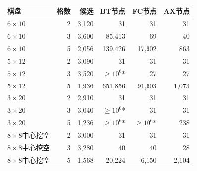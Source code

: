\begin{tabular}{lrrrrr}
\toprule
棋盘 & 格数 & 候选 & BT节点 & FC节点 & AX节点 \\
\midrule
$6\times10$ & 2 & 3,120 & 31 & 31 & 31 \\
$6\times10$ & 3 & 3,600 & 85,413 & 69 & 40 \\
$6\times10$ & 5 & 2,056 & 139,426 & 17,902 & 863 \\
$5\times12$ & 2 & 3,090 & 31 & 31 & 31 \\
$5\times12$ & 3 & 3,520 & $\geq 10^6$* & 27 & 27 \\
$5\times12$ & 5 & 1,936 & 651,856 & 91,603 & 1,073 \\
$3\times20$ & 2 & 2,910 & 31 & 31 & 31 \\
$3\times20$ & 3 & 3,040 & $\geq 10^6$* & 31 & 31 \\
$3\times20$ & 5 & 1,236 & $\geq 10^6$* & $\geq 10^6$* & 238 \\
$8\times8$中心挖空 & 2 & 3,000 & 31 & 31 & 31 \\
$8\times8$中心挖空 & 3 & 3,280 & 40 & 40 & 28 \\
$8\times8$中心挖空 & 5 & 1,568 & 20,224 & 6,150 & 2,104 \\
\bottomrule
\end{tabular}
